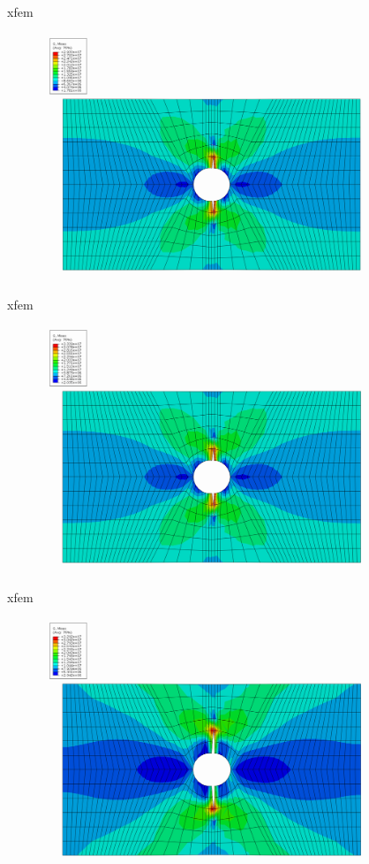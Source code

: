 \documentclass[10pt]{beamer}
\begin{document}
	\begin{frame}{xfem}
		\begin{figure}
			\centering
			\includegraphics[width=0.9\linewidth]{../Figures/xfem5}
		\end{figure}
	\end{frame}
	
	\begin{frame}{xfem}
		\begin{figure}
			\centering
			\includegraphics[width=0.9\linewidth]{../Figures/xfem6}
		\end{figure}
	\end{frame}
	
	\begin{frame}{xfem}
		\begin{figure}
			\centering
			\includegraphics[width=0.9\linewidth]{../Figures/xfem7}
		\end{figure}
	\end{frame}
	
\end{document}
